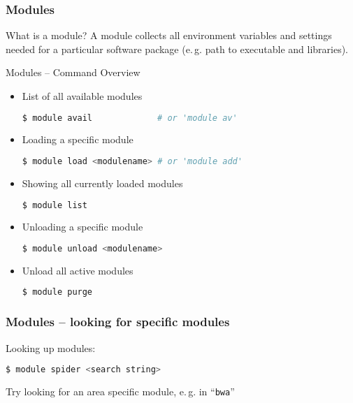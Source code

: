 \begin{frame}
  \frametitle{Modules}
  \vspace{-1.3em}
  \begin{block}{What is a module?}
    A module collects all environment variables and settings needed for a particular software package (e.\,g. path to executable and libraries).
  \end{block}

  \vfill
\end{frame}

\begin{frame}[fragile]
  {Modules -- Command Overview}
  \vspace{-1em}
  \begin{itemize}
    \setlength\itemsep{-0.1em}
  \item List of all available modules
    \begin{lstlisting}[language=Bash, style=Shell]
$ module avail             # or 'module av'
    \end{lstlisting}
  \item Loading a specific module
    \begin{lstlisting}[language=Bash, style=Shell]
$ module load <modulename> # or 'module add'
    \end{lstlisting}
  \item Showing all currently loaded modules
    \begin{lstlisting}[language=Bash, style=Shell]
$ module list
    \end{lstlisting}
  \item Unloading a specific module
    \begin{lstlisting}[language=Bash, style=Shell]
$ module unload <modulename>
    \end{lstlisting}
  \item Unload all active modules
    \begin{lstlisting}[language=Bash, style=Shell]
$ module purge
    \end{lstlisting}
  \end{itemize}
  \vfill
\end{frame}

\begin{frame}[fragile]
  \frametitle{Modules -- looking for specific modules}
  Looking up modules:
  \begin{lstlisting}[language=Bash, style=Shell]
$ module spider <search string>
  \end{lstlisting}
  \pause
  \begin{task}
  	Try looking for an area specific 
    module, e.\,g. in ``\texttt{bwa}''
  \end{task}
\end{frame}

